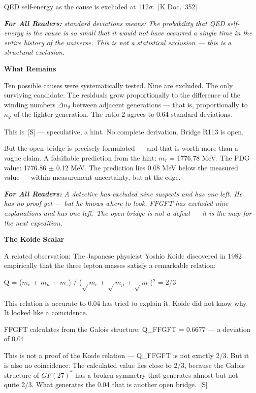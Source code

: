 \documentclass[11pt,oneside]{book}
\newcommand{\status}[1]{\penalty10000\,{\scriptsize\textcolor{gray!60}{[#1]}}}
\newenvironment{laierspur}{%
  \par\vspace{4pt}%
  \noindent\small\itshape\color{blue!60!black}%
  \textbf{For All Readers:}\enspace\ignorespaces}{%
  \par\vspace{4pt}\normalsize\normalfont\normalcolor}
\begin{document}
QED self-energy as the cause is excluded at 112$\sigma$. \status{K Doc.~352}

\begin{laierspur}
112 standard deviations means: The probability that QED self-energy is
the cause is so small that it would not have occurred a single time in the
entire history of the universe. This is not a statistical exclusion — this
is a structural exclusion.
\end{laierspur}

\textbf{What Remains}

Ten possible causes were systematically tested. Nine are excluded. The only
surviving candidate: The residuals grow proportionally to the difference of
the winding numbers $\Delta n_\theta$ between adjacent generations — that is,
proportionally to $n_\varphi$ of the lighter generation. The ratio 2 agrees to
0.64 standard deviations.

This is \status{S} — speculative, a hint. No complete derivation. Bridge R113
is open.

But the open bridge is precisely formulated — and that is worth more than a
vague claim. A falsifiable prediction from the hint: $m_\tau$ = 1776.78 MeV.
The PDG value: 1776.86 $\pm$ 0.12 MeV. The prediction lies 0.08 MeV below the
measured value — within measurement uncertainty, but at the edge.

\begin{laierspur}
A detective has excluded nine suspects and has one left. He has no proof
yet — but he knows where to look. FFGFT has excluded nine explanations and
has one left. The open bridge is not a defeat — it is the map for the next
expedition.
\end{laierspur}

\textbf{The Koide Scalar}

A related observation: The Japanese physicist Yoshio Koide discovered in
1982 empirically that the three lepton masses satisfy a remarkable relation:

Q = ($m_e$ + $m_\mu$ + $m_\tau$) / ($\sqrt{}m_e$ + $\sqrt{}m_\mu$ + $\sqrt{}m_\tau$)$^2$ = 2/3

This relation is accurate to 0.04%
has tried to explain it. Koide did not know why. It looked like a coincidence.

FFGFT calculates from the Galois structure: Q\_FFGFT = 0.6677 — a deviation
of 0.04%

This is not a proof of the Koide relation — Q\_FFGFT is not exactly 2/3.
But it is also no coincidence: The calculated value lies close to 2/3,
because the Galois structure of $GF(27)^*$ has a broken symmetry that
generates almost-but-not-quite 2/3. What generates the 0.04%
that is another open bridge. \status{S}
\end{document}
